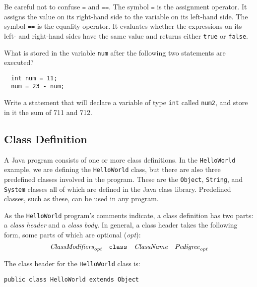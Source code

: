  {Be careful not to
confuse {\tt =} and {\tt ==}. The symbol {\tt =} is the assignment
operator. It assigns the value on its right-hand side to the variable
on its left-hand side. The symbol {\tt ==} is the equality
operator. It evaluates whether the expressions on its left- and
right-hand sides have the same value and returns either {\tt true} or
{\tt false}.}

\label{self-study-exercises}
\begin{SSTUDY}

\item What is stored in the variable {\tt num} after the following
two statements are executed?
\small
\begin{verbatim}
  int num = 11;
  num = 23 - num;
\end{verbatim}
\normalsize

\item Write a statement that will declare a variable of type {\tt int}
called {\tt num2}, and store in it the sum of 711 and 712. 

\end{SSTUDY}


\subsection{Class Definition}

\noindent A Java program consists of one or more class definitions. 
In the {\tt HelloWorld} example, we are defining the {\tt HelloWorld}
class, but there are also three predefined classes involved in the
program. These are the {\tt Object}, {\tt String}, and {\tt System}
classes all of which are defined in the Java class library. Predefined
classes, such as these, can be used in any program.

As the {\tt HelloWorld} program's comments indicate, a class definition
has two parts: a {\it class header} and a {\it class body}.  In
general, a class header takes the following form, some parts of which
are optional ({\em opt}):
$$
\hbox{\it ClassModifiers}_{\hbox{\scriptsize\it opt}}\quad
\hbox{\tt class}\quad
\hbox{\it ClassName}\quad
\hbox{\it Pedigree}_{\hbox{\scriptsize\it opt}}
$$

\noindent The class header for the {\tt HelloWorld} class is:

\begin{jjjlisting}
\begin{lstlisting}
public class HelloWorld extends Object
\end{lstlisting}
\end{jjjlisting}


